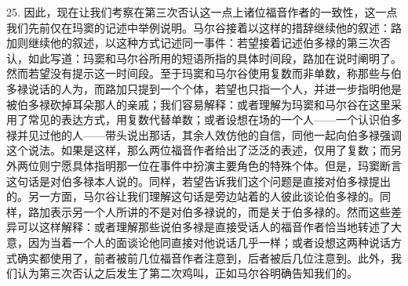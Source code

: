 25. 因此，现在让我们考察在第三次否认这一点上诸位福音作者的一致性，这一点我们先前仅在玛窦的记述中举例说明。马尔谷接着以这样的措辞继续他的叙述：路加则继续他的叙述，以这种方式记述同一事件：若望接着记述伯多禄的第三次否认，如此写道：玛窦和马尔谷所用的短语所指的具体时间段，路加在说时阐明了。然而若望没有提示这一时间段。至于玛窦和马尔谷使用复数而非单数，称那些与伯多禄说话的人为，而路加只提到一个个体，若望也只指一个人，并进一步指明他是被伯多禄砍掉耳朵那人的亲戚；我们容易解释：或者理解为玛窦和马尔谷在这里采用了常见的表达方式，用复数代替单数；或者设想在场的一个人——一个认识伯多禄并见过他的人——带头说出那话，其余人效仿他的自信，同他一起向伯多禄强调这个说法。如果是这样，那么两位福音作者给出了泛泛的表述，仅用了复数；而另外两位则宁愿具体指明那一位在事件中扮演主要角色的特殊个体。但是，玛窦断言这句话是对伯多禄本人说的。同样，若望告诉我们这个问题是直接对伯多禄提出的。另一方面，马尔谷让我们理解这句话是旁边站着的人彼此谈论伯多禄的。同样，路加表示另一个人所讲的不是对伯多禄说的，而是关于伯多禄的。然而这些差异可以这样解释：或者理解那些说伯多禄是直接受话人的福音作者恰当地转述了大意，因为当着一个人的面谈论他同直接对他说话几乎一样；或者设想这两种说话方式确实都使用了，前者被前几位福音作者注意到，后者被后几位注意到。此外，我们认为第三次否认之后发生了第二次鸡叫，正如马尔谷明确告知我们的。\par

